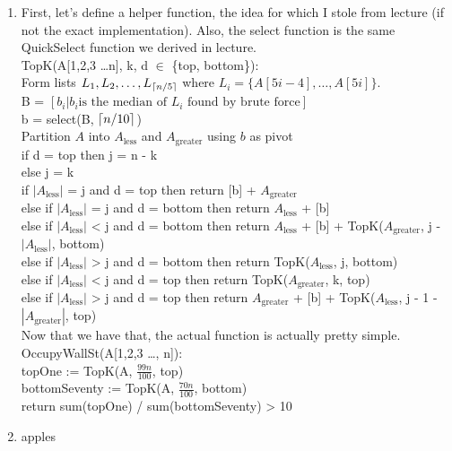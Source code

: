 \documentclass[11pt]{article}
\begin{document}
\begin{solution}
    \begin{enumerate}
        \item First, let's define a helper function, the idea for which I stole from lecture (if not the exact implementation). Also, the select function is the same QuickSelect function we derived in lecture. \\
            TopK(A[1,2,3 \ldots n], k, d $\in$ \{top, bottom\}):\\
            Form lists $L_1, L_2, \ldots, L_{\lceil n / 5 \rceil}$ where $L_i = \{A[5i - 4],\ldots,A[5i]\}$. \\
            B = $[ b_i | b_i \text{is the median of }L_i \text{ found by brute force}]$ \\ 
            b = select(B, $\lceil n / 10 \rceil$) \\
            Partition $A$ into $A_\text{less}$ and $A_\text{greater}$ using $b$ as pivot \\
            if d = top then j = n - k \\
            else j = k \\
            if $|A_\text{less}|$ = j and d = top then return [b] + $A_\text{greater}$ \\ 
            else if $|A_\text{less}|$ = j and d = bottom then return $A_\text{less}$ + [b] \\ 
            else if $|A_\text{less}|$ < j and d = bottom then return $A_\text{less}$ + [b] + TopK($A_\text{greater}$, j - $|A_\text{less}|$, bottom) \\
            else if $|A_\text{less}|$ > j and d = bottom then return TopK($A_\text{less}$, j, bottom) \\
            else if $|A_\text{less}|$ < j and d = top then return TopK($A_\text{greater}$, k, top) \\
            else if $|A_\text{less}|$ > j and d = top then return $A_\text{greater}$ + [b] + TopK($A_\text{less}$, j - 1 - $|A_\text{greater}|$, top) \\

            Now that we have that, the actual function is actually pretty simple. \\
            OccupyWallSt(A[1,2,3 \ldots, n]): \\
            topOne := TopK(A, $\frac{99n}{100}$, top) \\
            bottomSeventy := TopK(A, $\frac{70n}{100}$, bottom) \\
            return sum(topOne) / sum(bottomSeventy) > 10
        \item apples

    \end{enumerate}
\end{solution}
\end{document}
